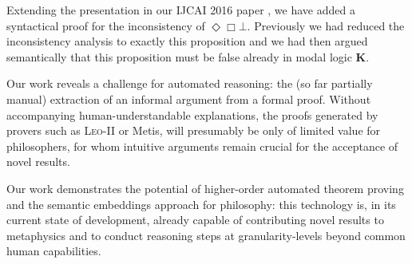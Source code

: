 \documentclass{llncs}
\newcommand{\logic}[1]{\textbf{#1}\xspace}
\newcommand{\K}{\logic{K}}
\newcommand{\SFive}{\logic{S5}}
\newcommand{\SFiveU}{\logic{S5\textsuperscript{U}}}
\newcommand{\Dia}{\Diamond} %
\newcommand{\nec}{\Box}
\newcommand{\pos}{\Dia}
\begin{document}
Extending the presentation in our IJCAI 2016 paper \cite{C55}, we have added
a syntactical proof for the inconsistency of  $\pos \nec \bot$.  Previously we had reduced the inconsistency
analysis to exactly this proposition and we had then argued
semantically that this proposition must be false already in modal
logic \K. 



Our work reveals a challenge for automated reasoning:
the (so far partially manual) extraction of an informal argument from a formal proof. 
Without accompanying human-understandable explanations,
the proofs generated by provers such as \textsc{Leo-II} or Metis, will
presumably be only of limited value for philosophers, for whom intuitive
arguments remain crucial for the acceptance of novel results.



Our work 
demonstrates
the potential of higher-order automated theorem proving and the
semantic embeddings approach for philosophy: this technology is,
in its current state of development, already capable of contributing novel results to
metaphysics and to conduct reasoning steps at granularity-levels
beyond common human capabilities.  
\vfill
\end{document}
